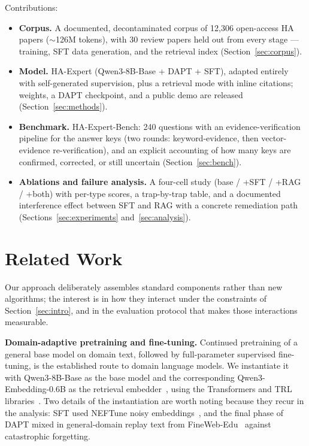 \documentclass[11pt]{article}
\begin{document}
Contributions:
\begin{itemize}
\item \textbf{Corpus.} A documented, decontaminated corpus of 12,306
open-access HA papers ($\sim$126M tokens), with 30 review papers held out
from every stage --- training, SFT data generation, and the retrieval
index (Section~\ref{sec:corpus}).
\item \textbf{Model.} HA-Expert (Qwen3-8B-Base + DAPT + SFT), adapted
entirely with self-generated supervision, plus a retrieval mode with
inline citations; weights, a DAPT checkpoint, and a public demo are
released (Section~\ref{sec:methods}).
\item \textbf{Benchmark.} HA-Expert-Bench: 240 questions with an
evidence-verification pipeline for the answer keys (two rounds:
keyword-evidence, then vector-evidence re-verification), and an explicit
accounting of how many keys are confirmed, corrected, or still uncertain
(Section~\ref{sec:bench}).
\item \textbf{Ablations and failure analysis.} A four-cell study
(base / +SFT / +RAG / +both) with per-type scores, a trap-by-trap table,
and a documented interference effect between SFT and RAG with a concrete
remediation path (Sections~\ref{sec:experiments}
and~\ref{sec:analysis}).
\end{itemize}

\section{Related Work}
\label{sec:related}

Our approach deliberately assembles standard components rather than new
algorithms; the interest is in how they interact under the constraints of
Section~\ref{sec:intro}, and in the evaluation protocol that makes those
interactions measurable.

\textbf{Domain-adaptive pretraining and fine-tuning.} Continued
pretraining of a general base model on domain text, followed by
full-parameter supervised fine-tuning, is the established route to domain
language models. We instantiate it with Qwen3-8B-Base as the base model
and the corresponding Qwen3-Embedding-0.6B as the retrieval
embedder~\cite{qwen3}, using the Transformers and TRL
libraries~\cite{transformers,trl}. Two details of the instantiation are
worth noting because they recur in the analysis: SFT used NEFTune noisy
embeddings~\cite{neftune}, and the final phase of DAPT mixed in
general-domain replay text from FineWeb-Edu~\cite{fineweb} against
catastrophic forgetting.
\end{document}
